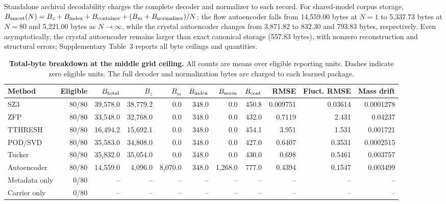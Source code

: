 \documentclass[10pt,a4paper,twocolumn]{article}
\begin{document}
Standalone archival decodability charges the complete decoder and normalizer to each record. For shared-model corpus storage, $B_{\rm amort}(N)=B_z+B_{\rm index}+B_{\rm container}+(B_m+B_{\rm normalizer})/N$; the flow autoencoder falls from 14,559.00 bytes at $N=1$ to 5,337.73 bytes at $N=80$ and 5,221.00 bytes as $N\to\infty$, while the crystal autoencoder changes from 3,871.82 to 832.30 and 793.83 bytes, respectively. Even asymptotically, the crystal autoencoder remains larger than exact canonical storage (557.83 bytes), with nonzero reconstruction and structural errors; Supplementary Table~3 reports all byte ceilings and quantities.

\begin{table}[t]
\caption{\textbf{Total-byte breakdown at the middle grid ceiling.} All counts are means over eligible reporting units. Dashes indicate zero eligible units. The full decoder and normalization bytes are charged to each learned package.}
\label{tab:matched-rate}
\small
\begin{tabularx}{\textwidth}{@{}Yrrrrrrrrrr@{}}
\toprule
Method & Eligible & $B_{\rm total}$ & $B_z$ & $B_m$ & $B_{\rm index}$ & $B_{\rm norm}$ & $B_{\rm cont}$ & RMSE & Fluct. RMSE & Mass drift\\
\midrule
SZ3 & 80/80 & 39,578.0 & 38,779.2 & 0.0 & 348.0 & 0.0 & 450.8 & 0.009751 & 0.03614 & 0.0001278\\
ZFP & 80/80 & 33,548.0 & 32,768.0 & 0.0 & 348.0 & 0.0 & 432.0 & 0.7119 & 2.431 & 0.04237\\
TTHRESH & 80/80 & 16,494.2 & 15,692.1 & 0.0 & 348.0 & 0.0 & 454.1 & 3.951 & 1.531 & 0.001721\\
POD/SVD & 80/80 & 35,583.0 & 34,808.0 & 0.0 & 348.0 & 0.0 & 427.0 & 0.6407 & 0.3531 & 0.0002515\\
Tucker & 80/80 & 35,832.0 & 35,054.0 & 0.0 & 348.0 & 0.0 & 430.0 & 0.698 & 0.5461 & 0.003757\\
Autoencoder & 80/80 & 14,559.0 & 4,096.0 & 8,070.0 & 348.0 & 1,268.0 & 777.0 & 0.4394 & 0.1547 & 0.003499\\
Metadata only & 0/80 & -- & -- & -- & -- & -- & -- & -- & -- & --\\
Carrier only & 0/80 & -- & -- & -- & -- & -- & -- & -- & -- & --\\
\bottomrule
\end{tabularx}
\end{table}
\end{document}
